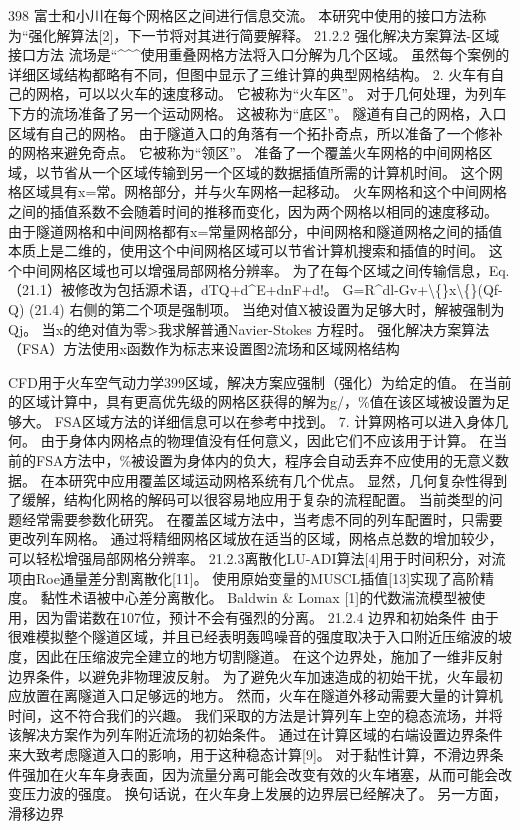 \documentclass[UTF8,11pt,a4paper,openany,fontset=fandol]{ctexbook}
\begin{document}
398 富士和小川在每个网格区之间进行信息交流。 本研究中使用的接口方法称为“强化解算法[2]，下一节将对其进行简要解释。 21.2.2 强化解决方案算法-区域接口方法 流场是“\textasciicircum{}\textasciicircum{}\textasciicircum{}使用重叠网格方法将入口分解为几个区域。 虽然每个案例的详细区域结构都略有不同，但图中显示了三维计算的典型网格结构。 2. 火车有自己的网格，可以以火车的速度移动。 它被称为“火车区”。 对于几何处理，为列车下方的流场准备了另一个运动网格。 这被称为“底区”。 隧道有自己的网格，入口区域有自己的网格。 由于隧道入口的角落有一个拓扑奇点，所以准备了一个修补的网格来避免奇点。 它被称为“领区”。 准备了一个覆盖火车网格的中间网格区域，以节省从一个区域传输到另一个区域的数据插值所需的计算机时间。 这个网格区域具有x=常。网格部分，并与火车网格一起移动。 火车网格和这个中间网格之间的插值系数不会随着时间的推移而变化，因为两个网格以相同的速度移动。 由于隧道网格和中间网格都有x=常量网格部分，中间网格和隧道网格之间的插值本质上是二维的，使用这个中间网格区域可以节省计算机搜索和插值的时间。 这个中间网格区域也可以增强局部网格分辨率。 为了在每个区域之间传输信息，Eq. （21.1）被修改为包括源术语，dTQ+d\textasciicircum{}E+dnF+d!。 G=R\textasciicircum{}dl-Gv+\textbackslash\{\}x\textbackslash\{\}(Qf-Q) (21.4) 右侧的第二个项是强制项。 当绝对值X被设置为足够大时，解被强制为Qj。 当x的绝对值为零>我求解普通Navier-Stokes 方程时。 强化解决方案算法（FSA）方法使用x函数作为标志来设置图2流场和区域网格结构

CFD用于火车空气动力学399区域，解决方案应强制（强化）为给定的值。 在当前的区域计算中，具有更高优先级的网格区获得的解为g/，\%值在该区域被设置为足够大。 FSA区域方法的详细信息可以在参考中找到。 7. 计算网格可以进入身体几何。 由于身体内网格点的物理值没有任何意义，因此它们不应该用于计算。 在当前的FSA方法中，\%被设置为身体内的负大，程序会自动丢弃不应使用的无意义数据。 在本研究中应用覆盖区域运动网格系统有几个优点。 显然，几何复杂性得到了缓解，结构化网格的解码可以很容易地应用于复杂的流程配置。 当前类型的问题经常需要参数化研究。 在覆盖区域方法中，当考虑不同的列车配置时，只需要更改列车网格。 通过将精细网格区域放在适当的区域，网格点总数的增加较少，可以轻松增强局部网格分辨率。 21.2.3离散化LU-ADI算法[4]用于时间积分，对流项由Roe通量差分割离散化[11]。 使用原始变量的MUSCL插值[13]实现了高阶精度。 黏性术语被中心差分离散化。 Baldwin \& Lomax [1]的代数湍流模型被使用，因为雷诺数在107位，预计不会有强烈的分离。 21.2.4 边界和初始条件 由于很难模拟整个隧道区域，并且已经表明轰鸣噪音的强度取决于入口附近压缩波的坡度，因此在压缩波完全建立的地方切割隧道。 在这个边界处，施加了一维非反射边界条件，以避免非物理波反射。 为了避免火车加速造成的初始干扰，火车最初应放置在离隧道入口足够远的地方。 然而，火车在隧道外移动需要大量的计算机时间，这不符合我们的兴趣。 我们采取的方法是计算列车上空的稳态流场，并将该解决方案作为列车附近流场的初始条件。 通过在计算区域的右端设置边界条件来大致考虑隧道入口的影响，用于这种稳态计算[9]。 对于黏性计算，不滑边界条件强加在火车车身表面，因为流量分离可能会改变有效的火车堵塞，从而可能会改变压力波的强度。 换句话说，在火车身上发展的边界层已经解决了。 另一方面，滑移边界
\end{document}
